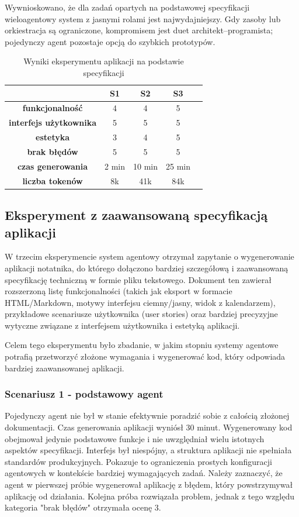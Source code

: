 Wywnioskowano, że dla zadań opartych na podstawowej specyfikacji wieloagentowy system z jasnymi rolami jest najwydajniejszy. Gdy zasoby lub orkiestracja są ograniczone, kompromisem jest duet architekt–programista; pojedynczy agent pozostaje opcją do szybkich prototypów.

\begin{table}[h!]
    \centering
    \begin{tabular}{|c|c|c|c|c|}
    \hline
    & \textbf{S1} & \textbf{S2} & \textbf{S3} \\
    \hline
    \textbf{funkcjonalność} & 4 & 4 & 5 \\
    \hline
    \textbf{interfejs użytkownika} & 5 & 5 & 5 \\
    \hline
    \textbf{estetyka} & 3 & 4 & 5 \\
    \hline
    \textbf{brak błędów} & 5 & 5 & 5 \\
    \hline
    \textbf{czas generowania} & 2 min & 10 min & 25 min \\
    \hline
    \textbf{liczba tokenów} & 8k & 41k & 84k \\
    \hline
    \end{tabular}
    \caption{Wyniki eksperymentu aplikacji na podstawie specyfikacji}
    \label{table:eksperyment-z-aplikacja-na-podstawie-specyfikacji}
\end{table}

\subsection{Eksperyment z zaawansowaną specyfikacją aplikacji}
W trzecim eksperymencie system agentowy otrzymał zapytanie o wygenerowanie aplikacji notatnika, do którego dołączono bardziej szczegółową i zaawansowaną specyfikację techniczną w formie pliku tekstowego. Dokument ten zawierał rozszerzoną listę funkcjonalności (takich jak eksport w formacie HTML/Markdown, motywy interfejsu ciemny/jasny, widok z kalendarzem), przykładowe scenariusze użytkownika (user stories) oraz bardziej precyzyjne wytyczne związane z interfejsem użytkownika i estetyką aplikacji.

Celem tego eksperymentu było zbadanie, w jakim stopniu systemy agentowe potrafią przetworzyć złożone wymagania i wygenerować kod, który odpowiada bardziej zaawansowanej aplikacji.

\subsubsection*{Scenariusz 1 - podstawowy agent}
Pojedynczy agent nie był w stanie efektywnie poradzić sobie z całością złożonej dokumentacji. Czas generowania aplikacji wyniósł 30 minut. Wygenerowany kod obejmował jedynie podstawowe funkcje i nie uwzględniał wielu istotnych aspektów specyfikacji. Interfejs był niespójny, a struktura aplikacji nie spełniała standardów produkcyjnych. Pokazuje to ograniczenia prostych konfiguracji agentowych w kontekście bardziej wymagających zadań. Należy zaznaczyć, że agent w pierwszej próbie wygenerował aplikację z błędem, który powstrzymywał aplikację od działania. Kolejna próba rozwiązała problem, jednak z tego względu kategoria "brak błędów" otrzymała ocenę 3.

